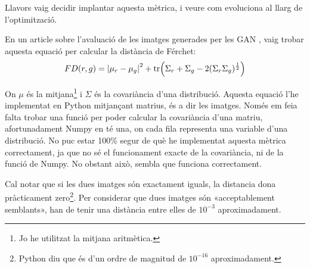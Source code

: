 Llavors vaig decidir implantar aquesta mètrica, i veure com evoluciona al llarg de l'optimització. 

En un article sobre l'avaluació de les imatges generades per les GAN \cite{sd_score}, vaig trobar aquesta equació per calcular la distància de Férchet:
$$
FD(r, g) = \abs{\mu_r - \mu_g}^2 + \tr(\Sigma_r + \Sigma_g -2(\Sigma_r\Sigma_g)^{\frac{1}{2}})
$$

On $\mu$ és la mitjana\footnote{Jo he utilitzat la mitjana aritmètica.} i $\Sigma$ és la covariància d'una distribució. Aquesta equació l'he implementat en Python mitjançant matrius, és a dir les imatges. Només em feia falta trobar una funció per poder calcular la covariància d'una matriu, afortunadament Numpy en té una, on cada fila representa una variable d'una distribució. No puc estar 100\% segur de què he implementat aquesta mètrica correctament, ja que no sé el funcionament exacte de la covariància, ni de la funció de Numpy. No obstant això, sembla que funciona correctament.

Cal notar que si les dues imatges són exactament iguals, la distancia dona pràcticament zero\footnote{Python diu que és d'un ordre de magnitud de $10^{-16}$ aproximadament.}. Per considerar que dues imatges són «acceptablement semblants», han de tenir una distància entre elles de $10^{-3}$ aproximadament.